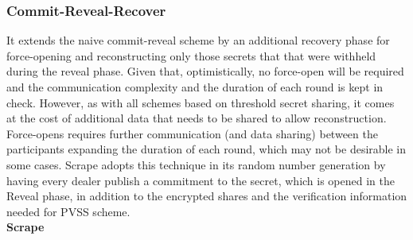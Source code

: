 \documentclass[letterpaper,twocolumn,10pt]{article}
\theoremstyle{definition}
\theoremstyle{remark}
\begin{document}
\subsubsection{Commit-Reveal-Recover}
It extends the naive commit-reveal scheme by an additional recovery phase for force-opening and reconstructing only those secrets that that were withheld during the reveal phase. Given that, optimistically, no force-open will be required and the communication complexity and the duration of each round is kept in check. However, as with all schemes based on threshold secret sharing, it comes at the cost of additional data that needs to be shared to allow reconstruction. Force-opens requires further communication (and data sharing) between the participants expanding the duration of each round, which may not be desirable in some cases. Scrape adopts this technique in its random number generation by having every dealer publish a commitment to the secret, which is opened in the Reveal phase, in addition to the encrypted shares and the verification information needed for PVSS scheme.\\

\textbf{Scrape}\\
\end{document}
